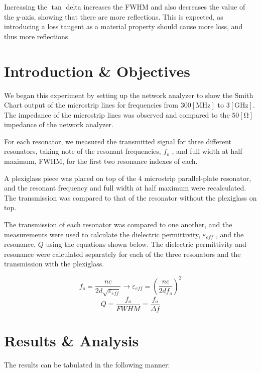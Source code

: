 \documentclass[
	letterpaper, %
	10pt, %
]{CSUniSchoolLabReport}
\begin{document}
Increasing the $\tan$ delta increases the FWHM and also decreases the value of the $y$-axis, showing that there are more reflections. This is expected, as introducing a loss tangent as a material property should cause more loss, and thus more reflections.

\section{Introduction \& Objectives}

We began this experiment by setting up the network analyzer to show the Smith Chart output of the microstrip lines for frequencies from $300[\si{\mega\hertz}]$ to $3[\si{\giga\hertz}]$. The impedance of the microstrip lines was observed and compared to the $50[\si{\ohm}]$ impedance of the network analyzer. 

	For each resonator, we measured the transmitted signal for three different resonators, taking note of the resonant frequencies, $f_o$ , and full width at half maximum, FWHM, for the first two resonance indexes of each. 

	A plexiglass piece was placed on top of the 4 microstrip parallel-plate resonator, and the resonant frequency and full width at half maximum were recalculated. The transmission was compared to that of the resonator without the plexiglass on top.

    The transmission of each resonator was compared to one another, and the measurements were used to calculate the dielectric permittivity, $\varepsilon_{eff}$ , and the resonance, $Q$ using the equations shown below. The dielectric permittivity and resonance were calculated separately for each of the three resonators and the transmission with the plexiglass.

    $$f_o=\frac{nc}{2d\sqrt{\varepsilon_{eff}}}\to\varepsilon_{eff}=\left( \frac{nc}{2df_o} \right)^2$$
    $$Q=\frac{f_o}{FWHM}=\frac{f_o}{\Delta f}$$

\section{Results \& Analysis} 

The results can be tabulated in the following manner:
\end{document}
